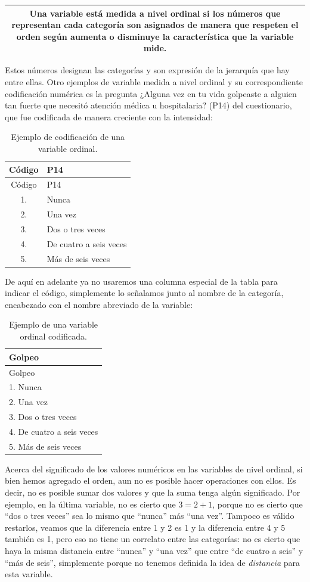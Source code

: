 \documentclass[]{book}
\begin{document}
\begin{longtable}[]{@{}c@{}}
\toprule
\endhead
\begin{minipage}[t]{0.97\columnwidth}\centering
Una variable está medida a nivel \textbf{ordinal} si los números que representan cada categoría son asignados de manera que respeten el orden según aumenta o disminuye la característica que la variable mide.\strut
\end{minipage}\tabularnewline
\bottomrule
\end{longtable}

Estos números designan las categorías y son expresión de la jerarquía que hay entre ellas. Otro ejemplos de variable medida a nivel ordinal y su correspondiente codificación numérica es la pregunta ¿Alguna vez en tu vida golpeaste a alguien tan fuerte que necesitó atención médica u hospitalaria? (P14) del cuestionario, que fue codificada de manera creciente con la intensidad:

\begin{longtable}[]{@{}cl@{}}
\caption{\label{tab:unnamed-chunk-9}Ejemplo de codificación de una variable ordinal.}\tabularnewline
\toprule
Código & P14\tabularnewline
\midrule
\endfirsthead
\toprule
Código & P14\tabularnewline
\midrule
\endhead
1. & Nunca\tabularnewline
2. & Una vez\tabularnewline
3. & Dos o tres veces\tabularnewline
4. & De cuatro a seis veces\tabularnewline
5. & Más de seis veces\tabularnewline
\bottomrule
\end{longtable}

De aquí en adelante ya no usaremos una columna especial de la tabla para indicar el código, simplemente lo señalamos junto al nombre de la categoría, encabezado con el nombre abreviado de la variable:

\begin{longtable}[]{@{}l@{}}
\caption{\label{tab:unnamed-chunk-10}Ejemplo de una variable ordinal codificada.}\tabularnewline
\toprule
Golpeo\tabularnewline
\midrule
\endfirsthead
\toprule
Golpeo\tabularnewline
\midrule
\endhead
1. Nunca\tabularnewline
2. Una vez\tabularnewline
3. Dos o tres veces\tabularnewline
4. De cuatro a seis veces\tabularnewline
5. Más de seis veces\tabularnewline
\bottomrule
\end{longtable}

Acerca del significado de los valores numéricos en las variables de nivel ordinal, si bien hemos agregado el orden, aun no es posible hacer operaciones con ellos. Es decir, no es posible sumar dos valores y que la suma tenga algún significado. Por ejemplo, en la última variable, no es cierto que \(3 = 2+1\), porque no es cierto que ``dos o tres veces'' sea lo mismo que ``nunca'' más ``una vez''. Tampoco es válido restarlos, veamos que la diferencia entre 1 y 2 es 1 y la diferencia entre 4 y 5 también es 1, pero eso no tiene un correlato entre las categorías: no es cierto que haya la misma distancia entre ``nunca'' y ``una vez'' que entre ``de cuatro a seis'' y ``más de seis'', simplemente porque no tenemos definida la idea de \emph{distancia} para esta variable.
\end{document}
